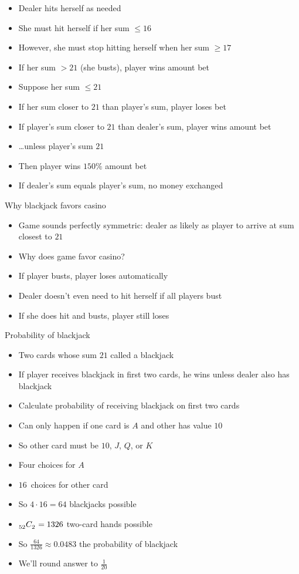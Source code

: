 \documentclass{beamer}
\theoremstyle{definition}
\newcommand\ncr[2]{\tensor[_{#1}]C{_{#2}}}
\begin{document}
\begin{frame}
\begin{itemize}
\item Dealer hits herself as needed
\item She \alert{must} hit herself if her sum $\le 16$
\item However, she must stop hitting herself when her sum $\ge 17$
\item If her sum $>21$ (she \alert{busts}), player wins amount bet
\item Suppose her sum $\le 21$
\item If her sum closer to $21$ than player's sum,
player loses bet
\item If player's sum closer to $21$ than dealer's sum,
player wins amount bet
\item \dots unless player's sum $21$
\item Then player wins $150\%$ amount bet
\item If dealer's sum equals player's sum, no money exchanged
\end{itemize}
\end{frame}

\begin{frame}{Why blackjack favors casino}
\begin{itemize}
\item Game sounds perfectly symmetric: dealer as likely
as player to arrive at sum closest to $21$
\item Why does game favor casino?
\item If player busts, player loses automatically
\item Dealer doesn't even need to hit herself if all
players bust
\item If she does hit and busts, player still loses
\end{itemize}
\end{frame}

\begin{frame}{Probability of blackjack}
\begin{itemize}
\item Two cards whose sum $21$ called a \alert{blackjack}
\item If player receives blackjack in first two cards,
he wins unless dealer also has blackjack
\item Calculate probability of receiving blackjack on first two cards
\item Can only happen if one card is $A$ and other
has value $10$
\item So other card must be $10$, $J$, $Q$, or $K$
\item Four choices for $A$
\item $16$~choices for other card
\item So $4\cdot 16=64$ blackjacks possible
\item $\ncr{52}{2}=1326$ two-card hands possible 
\item So $\frac{64}{1326}\approx 0.0483$ the probability of blackjack
\item We'll round answer to $\frac{1}{20}$
\end{itemize}
\end{frame}
\end{document}
